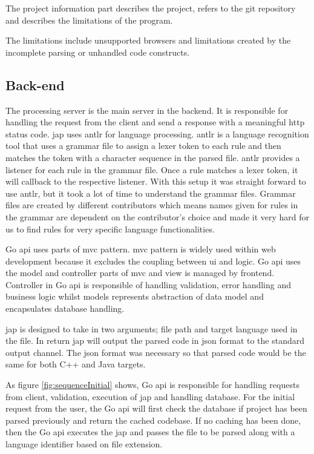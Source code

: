 The project information part describes the project, refers to the \gls{git} repository  and describes the limitations of the program.

The limitations include unsupported browsers and limitations created by the incomplete parsing or unhandled code constructs.

\subsection{Back-end}
\label{sec:technicalBackEnd}
The processing server is the main server in the \gls{backend}. It is responsible for handling the request from the \gls{client} and send a response with a meaningful \gls{http} status code. \Gls{jap} uses \gls{antlr} for language processing. \gls{antlr} is a language recognition tool that uses a grammar file to assign a lexer token to each rule and then matches the token with a character sequence in the parsed file. \gls{antlr} provides a listener for each rule in the grammar file. Once a rule matches a lexer token, it will callback to the respective listener. With this setup it was straight forward to use \gls{antlr}, but it took a lot of time to understand the grammar files. Grammar files are created by different contributors which means names given for rules in the grammar are dependent on the contributor's choice and made it very hard for us to find rules for very specific language functionalities.

Go \gls{api} uses parts of \gls{mvc} pattern. \gls{mvc} pattern is widely used within web development because it excludes the coupling between \gls{ui} and logic. Go \gls{api} uses the model and controller parts of \gls{mvc} and view is managed by \gls{frontend}. Controller in Go \gls{api} is responsible of handling validation, error handling and business logic whilst models represents abstraction of data model and encapsulates database handling.

\gls{jap} is designed to take in two arguments; file path and target language used in the file. In return \gls{jap} will output the parsed code in \gls{json} format to the standard output channel. The \gls{json} format was necessary so that parsed code would be the same for both C++ and Java targets.

As figure \ref{fig:sequenceInitial} shows, Go \gls{api} is responsible for handling requests from \gls{client}, validation, execution of \gls{jap} and handling database. For the initial request from the user, the Go \gls{api} will first check the database if project has been parsed previously and return the cached codebase. If no caching has been done, then the Go \gls{api} executes the \gls{jap} and passes the file to be parsed along with a language identifier based on file extension.

